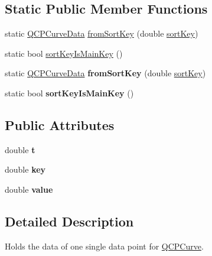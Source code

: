 \subsection*{Static Public Member Functions}
\begin{DoxyCompactItemize}
\item 
static \hyperlink{class_q_c_p_curve_data}{Q\+C\+P\+Curve\+Data} \hyperlink{class_q_c_p_curve_data_a40adf1a6ba93051c415a65298b49aa6e}{from\+Sort\+Key} (double \hyperlink{class_q_c_p_curve_data_a583174f2b68e01b4d545f04571f58bd0}{sort\+Key})
\item 
static bool \hyperlink{class_q_c_p_curve_data_a1b78f228e31ca40a1e69add44537918c}{sort\+Key\+Is\+Main\+Key} ()
\item 
\mbox{\label{class_q_c_p_curve_data_a40adf1a6ba93051c415a65298b49aa6e}} 
static \hyperlink{class_q_c_p_curve_data}{Q\+C\+P\+Curve\+Data} {\bfseries from\+Sort\+Key} (double \hyperlink{class_q_c_p_curve_data_a583174f2b68e01b4d545f04571f58bd0}{sort\+Key})
\item 
\mbox{\label{class_q_c_p_curve_data_a22bb516e31f7e4b28e314a1da20f2526}} 
static bool {\bfseries sort\+Key\+Is\+Main\+Key} ()
\end{DoxyCompactItemize}
\subsection*{Public Attributes}
\begin{DoxyCompactItemize}
\item 
\mbox{\label{class_q_c_p_curve_data_aecc395525be28e9178a088793beb3ff3}} 
double {\bfseries t}
\item 
\mbox{\label{class_q_c_p_curve_data_a8a4ec5f2b9a396149fd842e309701bd4}} 
double {\bfseries key}
\item 
\mbox{\label{class_q_c_p_curve_data_a72b39b8e1dbf7b45382ebd48419b6828}} 
double {\bfseries value}
\end{DoxyCompactItemize}


\subsection{Detailed Description}
Holds the data of one single data point for \hyperlink{class_q_c_p_curve}{Q\+C\+P\+Curve}. 

